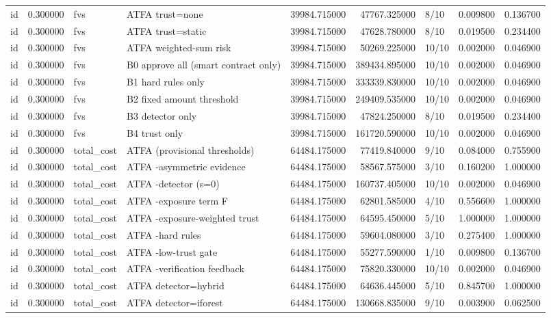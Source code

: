 \begin{tabular}{lrllrrlrr}
id & 0.300000 & fvs & ATFA trust=none & 39984.715000 & 47767.325000 & 8/10 & 0.009800 & 0.136700 \\
id & 0.300000 & fvs & ATFA trust=static & 39984.715000 & 47628.780000 & 8/10 & 0.019500 & 0.234400 \\
id & 0.300000 & fvs & ATFA weighted-sum risk & 39984.715000 & 50269.225000 & 10/10 & 0.002000 & 0.046900 \\
id & 0.300000 & fvs & B0 approve all (smart contract only) & 39984.715000 & 389434.895000 & 10/10 & 0.002000 & 0.046900 \\
id & 0.300000 & fvs & B1 hard rules only & 39984.715000 & 333339.830000 & 10/10 & 0.002000 & 0.046900 \\
id & 0.300000 & fvs & B2 fixed amount threshold & 39984.715000 & 249409.535000 & 10/10 & 0.002000 & 0.046900 \\
id & 0.300000 & fvs & B3 detector only & 39984.715000 & 47824.250000 & 8/10 & 0.019500 & 0.234400 \\
id & 0.300000 & fvs & B4 trust only & 39984.715000 & 161720.590000 & 10/10 & 0.002000 & 0.046900 \\
id & 0.300000 & total\_cost & ATFA (provisional thresholds) & 64484.175000 & 77419.840000 & 9/10 & 0.084000 & 0.755900 \\
id & 0.300000 & total\_cost & ATFA -asymmetric evidence & 64484.175000 & 58567.575000 & 3/10 & 0.160200 & 1.000000 \\
id & 0.300000 & total\_cost & ATFA -detector (s=0) & 64484.175000 & 160737.405000 & 10/10 & 0.002000 & 0.046900 \\
id & 0.300000 & total\_cost & ATFA -exposure term F & 64484.175000 & 62801.585000 & 4/10 & 0.556600 & 1.000000 \\
id & 0.300000 & total\_cost & ATFA -exposure-weighted trust & 64484.175000 & 64595.450000 & 5/10 & 1.000000 & 1.000000 \\
id & 0.300000 & total\_cost & ATFA -hard rules & 64484.175000 & 59604.080000 & 3/10 & 0.275400 & 1.000000 \\
id & 0.300000 & total\_cost & ATFA -low-trust gate & 64484.175000 & 55277.590000 & 1/10 & 0.009800 & 0.136700 \\
id & 0.300000 & total\_cost & ATFA -verification feedback & 64484.175000 & 75820.330000 & 10/10 & 0.002000 & 0.046900 \\
id & 0.300000 & total\_cost & ATFA detector=hybrid & 64484.175000 & 64636.445000 & 5/10 & 0.845700 & 1.000000 \\
id & 0.300000 & total\_cost & ATFA detector=iforest & 64484.175000 & 130668.835000 & 9/10 & 0.003900 & 0.062500 \\

\end{tabular}
